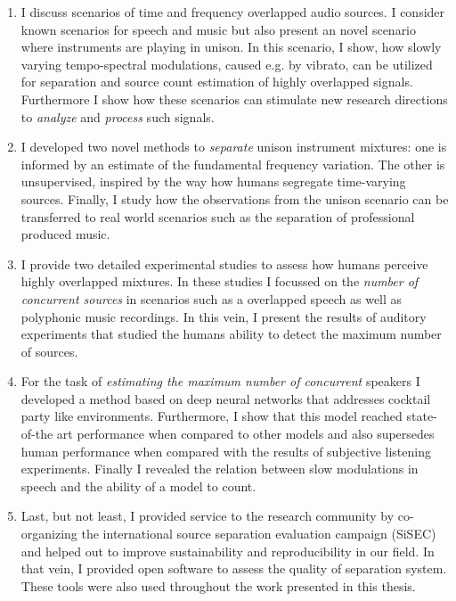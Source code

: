 \begin{enumerate}
\item I discuss scenarios of time and frequency overlapped audio sources.
I consider known scenarios for speech and music but also present an novel scenario where instruments are playing in unison.
In this scenario, I show, how slowly varying tempo-spectral modulations, caused e.g. by vibrato, can be utilized for separation and source count estimation of highly overlapped signals.
Furthermore I show how these scenarios can stimulate new research directions to \emph{analyze} and \emph{process} such signals.\\

\item I developed two novel methods to \emph{separate} unison instrument mixtures: one is informed by an estimate of the fundamental frequency variation.
The other is unsupervised, inspired by the way how humans segregate time-varying sources.
Finally, I study how the observations from the unison scenario can be transferred to real world scenarios such as the separation of professional produced music.\\

\item I provide two detailed experimental studies to assess how humans perceive highly overlapped mixtures.
In these studies I focussed on the \emph{number of concurrent sources} in scenarios such as a overlapped speech as well as polyphonic music recordings.
In this vein, I present the results of auditory experiments that studied the humans ability to detect the maximum number of sources.\\

\item For the task of \emph{estimating the maximum number of concurrent} speakers I developed a method based on deep neural networks that addresses cocktail party like environments.
Furthermore, I show that this model reached state-of-the art performance when compared to other models and also supersedes human performance when compared with the results of subjective listening experiments.
Finally I revealed the relation between slow modulations in speech and the ability of a model to count.\\

\item Last, but not least, I provided service to the research community by co-organizing the international source separation evaluation campaign (SiSEC) and helped out to improve sustainability and reproducibility in our field.
In that vein, I provided open software to assess the quality of separation system. 
These tools were also used throughout the work presented in this thesis.
\end{enumerate}

